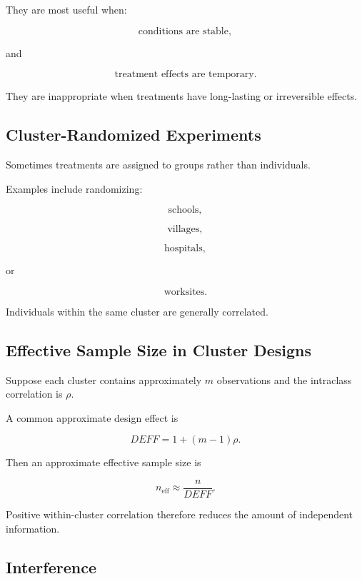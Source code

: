 They are most useful when:

\[
\boxed{
\text{conditions are stable},
}
\]

and

\[
\boxed{
\text{treatment effects are temporary}.
}
\]

They are inappropriate when treatments have long-lasting or irreversible
effects.

\subsection{Cluster-Randomized Experiments}
\label{subsec:cluster-randomized-experiments}

Sometimes treatments are assigned to groups rather than individuals.

Examples include randomizing:

\[
\boxed{
\text{schools},
}
\]

\[
\boxed{
\text{villages},
}
\]

\[
\boxed{
\text{hospitals},
}
\]

or

\[
\boxed{
\text{worksites}.
}
\]

Individuals within the same cluster are generally correlated.

\subsection{Effective Sample Size in Cluster Designs}
\label{subsec:effective-sample-size-cluster}

Suppose each cluster contains approximately \(m\) observations and the
intraclass correlation is \(\rho\).

A common approximate design effect is

\[
\boxed{
DEFF
=
1+(m-1)\rho.
}
\]

Then an approximate effective sample size is

\[
\boxed{
n_{\text{eff}}
\approx
\frac{
n
}{
DEFF
}.
}
\]

Positive within-cluster correlation therefore reduces the amount of
independent information.

\subsection{Interference}
\label{subsec:experimental-interference}

